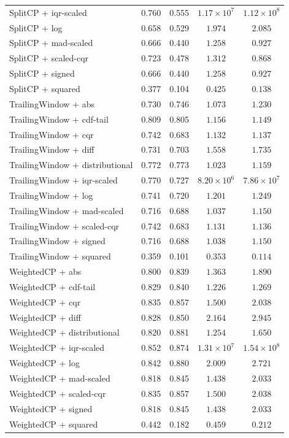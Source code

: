 \begin{longtable}{lcccc}
	SplitCP + iqr-scaled & 0.760 & 0.555 & $1.17 \times 10^{7}$ & $1.12 \times 10^{8}$ \\
	SplitCP + log & 0.658 & 0.529 & $1.974$ & $2.085$ \\
	SplitCP + mad-scaled & 0.666 & 0.440 & $1.258$ & $0.927$ \\
	SplitCP + scaled-cqr & 0.723 & 0.478 & $1.312$ & $0.868$ \\
	SplitCP + signed & 0.666 & 0.440 & $1.258$ & $0.927$ \\
	SplitCP + squared & 0.377 & 0.104 & $0.425$ & $0.138$ \\
	TrailingWindow + abs & 0.730 & 0.746 & $1.073$ & $1.230$ \\
	TrailingWindow + cdf-tail & 0.809 & 0.805 & $1.156$ & $1.149$ \\
	TrailingWindow + cqr & 0.742 & 0.683 & $1.132$ & $1.137$ \\
	TrailingWindow + diff & 0.731 & 0.703 & $1.558$ & $1.735$ \\
	TrailingWindow + distributional & 0.772 & 0.773 & $1.023$ & $1.159$ \\
	TrailingWindow + iqr-scaled & 0.770 & 0.727 & $8.20 \times 10^{6}$ & $7.86 \times 10^{7}$ \\
	TrailingWindow + log & 0.741 & 0.720 & $1.201$ & $1.249$ \\
	TrailingWindow + mad-scaled & 0.716 & 0.688 & $1.037$ & $1.150$ \\
	TrailingWindow + scaled-cqr & 0.742 & 0.683 & $1.131$ & $1.136$ \\
	TrailingWindow + signed & 0.716 & 0.688 & $1.038$ & $1.150$ \\
	TrailingWindow + squared & 0.359 & 0.101 & $0.353$ & $0.114$ \\
	WeightedCP + abs & 0.800 & 0.839 & $1.363$ & $1.890$ \\
	WeightedCP + cdf-tail & 0.829 & 0.840 & $1.226$ & $1.269$ \\
	WeightedCP + cqr & 0.835 & 0.857 & $1.500$ & $2.038$ \\
	WeightedCP + diff & 0.828 & 0.850 & $2.164$ & $2.945$ \\
	WeightedCP + distributional & 0.820 & 0.881 & $1.254$ & $1.650$ \\
	WeightedCP + iqr-scaled & 0.852 & 0.874 & $1.31 \times 10^{7}$ & $1.54 \times 10^{8}$ \\
	WeightedCP + log & 0.842 & 0.880 & $2.009$ & $2.721$ \\
	WeightedCP + mad-scaled & 0.818 & 0.845 & $1.438$ & $2.033$ \\
	WeightedCP + scaled-cqr & 0.835 & 0.857 & $1.500$ & $2.038$ \\
	WeightedCP + signed & 0.818 & 0.845 & $1.438$ & $2.033$ \\
	WeightedCP + squared & 0.442 & 0.182 & $0.459$ & $0.212$ \\
\end{longtable}

